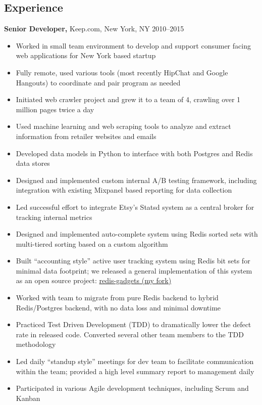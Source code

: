 \documentclass[margin]{res}
\begin{document}
\begin{resume}
\section{Experience}
 {\bf Senior Developer,} Keep.com, New York, NY \hfill 2010--2015
\begin{itemize}
  \item Worked in small team environment to develop and support consumer
    facing web applications for New York based startup
  \item Fully remote, used various tools (most recently HipChat and Google
    Hangouts) to coordinate and pair program as needed
  \item Initiated web crawler project and grew it to a team of 4, crawling
    over 1 million pages twice a day
  \item Used machine learning and web scraping tools to analyze and extract
    information from retailer websites and emails
  \item Developed data models in Python to interface with both Postgres and
    Redis data stores
  \item Designed and implemented custom internal A/B testing framework,
    including integration with existing Mixpanel based reporting for data
    collection
  \item Led successful effort to integrate Etsy's Statsd system as a central
    broker for tracking internal metrics
  \item Designed and implemented auto-complete system using Redis sorted sets
    with multi-tiered sorting based on a custom algorithm
  \item Built ``accounting style'' active user tracking system using Redis bit
    sets for minimal data footprint; we released a general implementation of
    this system as an open source project:
    \href{https://github.com/not-napoleon/redis-gadgets}{redis-gadgets (my
    fork)}
  \item Worked with team to migrate from pure Redis backend to hybrid
    Redis/Postgres backend, with no data loss and minimal downtime
  \item Practiced Test Driven Development (TDD) to dramatically lower the
      defect rate in released code.  Converted several other team members to
      the TDD methodology
  \item Led daily “standup style” meetings for dev team to facilitate
    communication within the team; provided a high level summary report to
    management daily
  \item Participated in various Agile development techniques, including Scrum
    and Kanban
\end{itemize}


\end{resume}
\end{document}
